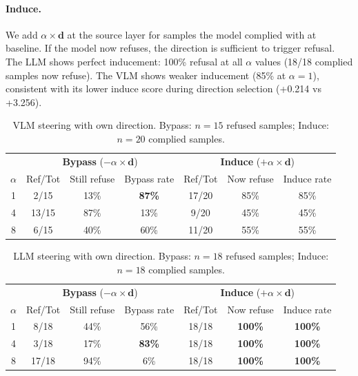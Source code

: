 \documentclass[11pt,a4paper]{article}
\begin{document}
\paragraph{Induce.} We add $\alpha \times \mathbf{d}$ at the source layer for samples the model complied with at baseline. If the model now refuses, the direction is sufficient to trigger refusal. The LLM shows perfect inducement: 100\% refusal at all $\alpha$ values (18/18 complied samples now refuse). The VLM shows weaker inducement (85\% at $\alpha=1$), consistent with its lower induce score during direction selection (+0.214 vs +3.256).

\begin{table}[H]\centering
\caption{VLM steering with own direction. Bypass: $n=15$ refused samples; Induce: $n=20$ complied samples.}
\begin{tabular}{c|ccc|ccc}
\toprule
& \multicolumn{3}{c|}{\textbf{Bypass} ($-\alpha \times \mathbf{d}$)} & \multicolumn{3}{c}{\textbf{Induce} ($+\alpha \times \mathbf{d}$)} \\
$\alpha$ & Ref/Tot & Still refuse & Bypass rate & Ref/Tot & Now refuse & Induce rate \\
\midrule
1 & 2/15  & 13\% & \textbf{87\%} & 17/20 & 85\% & 85\% \\
4 & 13/15 & 87\% & 13\%          &  9/20 & 45\% & 45\% \\
8 &  6/15 & 40\% & 60\%          & 11/20 & 55\% & 55\% \\
\bottomrule
\end{tabular}
\end{table}

\begin{table}[H]\centering
\caption{LLM steering with own direction. Bypass: $n=18$ refused samples; Induce: $n=18$ complied samples.}
\begin{tabular}{c|ccc|ccc}
\toprule
& \multicolumn{3}{c|}{\textbf{Bypass} ($-\alpha \times \mathbf{d}$)} & \multicolumn{3}{c}{\textbf{Induce} ($+\alpha \times \mathbf{d}$)} \\
$\alpha$ & Ref/Tot & Still refuse & Bypass rate & Ref/Tot & Now refuse & Induce rate \\
\midrule
1 &  8/18 & 44\% & 56\%          & 18/18 & \textbf{100\%} & \textbf{100\%} \\
4 &  3/18 & 17\% & \textbf{83\%} & 18/18 & \textbf{100\%} & \textbf{100\%} \\
8 & 17/18 & 94\% & 6\%           & 18/18 & \textbf{100\%} & \textbf{100\%} \\
\bottomrule
\end{tabular}
\end{table}
\end{document}
